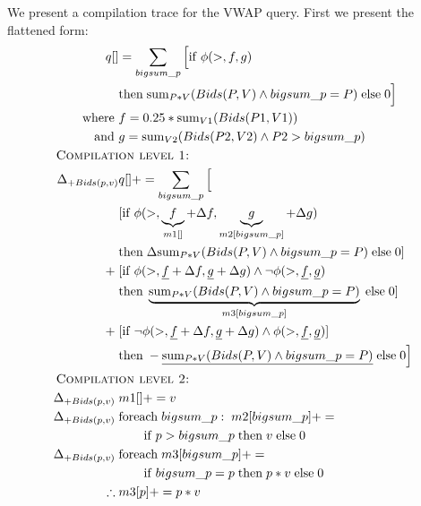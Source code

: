 \begin{example}
We present a compilation trace for the VWAP query. First we present the
flattened form:
\begin{align*}
q[] & = \sum_{bigsum\_p}{\Big[\algif \; \phi(>, f, g) }\\
    & \algthen \; \algsum_{P*V}(Bids(P,V) \wedge bigsum\_p = P) \;
      \algelse \; 0 \Big]\\
\mbox{where } & f = 0.25*\algsum_{V1}(Bids(P1,V1))\\
\mbox{and } & g = \algsum_{V2}(Bids(P2,V2) \wedge P2 > bigsum\_p)
\\
& \hspace{-1.75cm}\mbox{\sc Compilation level 1:}\\
\Delta_{+Bids(p,v)} & q[] += \sum_{bigsum\_p} \Big[ \\
& [ \algif \; \phi(>,\underbrace{f}_{m1[]}+\Delta f, \underbrace{g}_{m2[bigsum\_p]}+\Delta g) \; \\
& \algthen \; \Delta \algsum_{P*V}(Bids(P,V) \wedge bigsum\_p = P) \;
    \algelse \; 0 ] \\
+ \; & [ \algif \; \phi(>,\underline{f}+\Delta f, \underline{g}+\Delta g) \wedge
    \neg\phi(>,\underline{f},\underline{g}) \\
& \algthen \; \underbrace{\algsum_{P*V}(Bids(P,V) \wedge
    bigsum\_p = P)}_{m3[bigsum\_p]} \;
    \algelse \; 0 ] \\
+ \; & [ \algif \; \neg \phi(>, \underline{f}+\Delta f, \underline{g}+\Delta g)
    \wedge \phi(>,\underline{f},\underline{g}) ] \\
& \algthen \; - \underline{\algsum_{P*V}(Bids(P,V) \wedge bigsum\_p = P)} \;
    \algelse \; 0
\Big]\\
& \hspace{-1.75cm}\mbox{\sc Compilation level 2:}\\
\Delta_{+Bids(p,v)} \; & m1[] += v\\
\Delta_{+Bids(p,v)} \; & \algforeach \; bigsum\_p : \; m2[bigsum\_p] += \\
& \qquad \algif \; p > bigsum\_p \;\algthen \; v \; \algelse \; 0 \\
\Delta_{+Bids(p,v)} \; & \algforeach \; m3[bigsum\_p] += \\
& \qquad \algif \; bigsum\_p = p \; \algthen \; p*v \; \algelse \; 0\\
\therefore \; & m3[p] += p*v
\end{align*}
\end{example}


